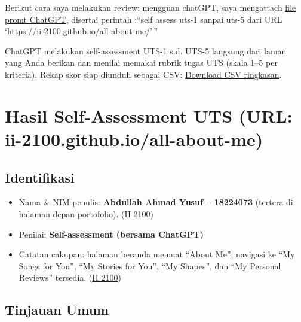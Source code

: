 \documentclass[
  letterpaper,
  DIV=11,
  numbers=noendperiod]{scrreprt}
\providecommand{\tightlist}{%
  \setlength{\itemsep}{0pt}\setlength{\parskip}{0pt}}
\begin{document}
Berikut cara saya melakukan review: mengguan chatGPT, saya mengattach
\href{skor_uts.pdf}{file promt ChatGPT}, disertai perintah :``self
assess uts-1 sanpai uts-5 dari URL
`https://ii-2100.github.io/all-about-me/'\,''

ChatGPT melakukan self-assessment UTS-1 s.d. UTS-5 langsung dari laman
yang Anda berikan dan menilai memakai rubrik tugas UTS (skala 1--5 per
kriteria). Rekap skor siap diunduh sebagai CSV:
\href{sandbox:/mnt/data/UTS_self_assessment.csv}{Download CSV
ringkasan}.


\chapter{Hasil Self-Assessment UTS (URL:
ii-2100.github.io/all-about-me)}\label{hasil-self-assessment-uts-url-ii-2100.github.ioall-about-me}

\section{Identifikasi}\label{identifikasi}

\begin{itemize}
\tightlist
\item
  Nama \& NIM penulis: \textbf{Abdullah Ahmad Yusuf -- 18224073}
  (tertera di halaman depan portofolio).
  (\href{https://ii-2100.github.io/all-about-me/}{II 2100})
\item
  Penilai: \textbf{Self-assessment (bersama ChatGPT)}
\item
  Catatan cakupan: halaman beranda memuat ``About Me''; navigasi ke ``My
  Songs for You'', ``My Stories for You'', ``My Shapes'', dan ``My
  Personal Reviews'' tersedia.
  (\href{https://ii-2100.github.io/all-about-me/}{II 2100})
\end{itemize}

\section{Tinjauan Umum}\label{tinjauan-umum}
\end{document}
